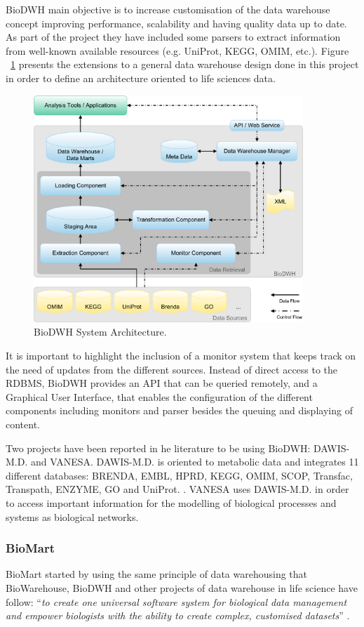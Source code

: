 BioDWH main objective is to increase customisation of the data warehouse concept improving performance, scalability and having quality data up to date. As part of the project they have included some parsers to extract information from well-known available resources (e.g. UniProt, KEGG, OMIM, etc.). Figure ~\ref{fig:biodwh} presents the extensions to a general data warehouse design done in this project in order to define an architecture oriented to life sciences data.

\begin{figure}  
\centering
\includegraphics[width=4in]{figures/dwh_architecture.png}
\caption[BioDWH System Architecture.]{BioDWH System Architecture.
\label{fig:biodwh}}
\end{figure}

It is important to highlight the inclusion of a monitor system that keeps track on the need of updates from the different sources. Instead of direct access to the RDBMS, BioDWH provides an API that can be queried remotely, and a Graphical User Interface, that enables the configuration of the different components including monitors and parser besides the queuing and displaying of content.

Two projects have been reported in he literature to be using BioDWH: DAWIS-M.D. and VANESA. DAWIS-M.D. is oriented to metabolic data and integrates 11 different databases: BRENDA, EMBL, HPRD, KEGG, OMIM, SCOP, Transfac, Transpath, ENZYME, GO and UniProt. \cite{HIP2010}. VANESA uses DAWIS-M.D. in order to access important information for the modelling of biological processes and systems as biological networks\cite{BRI2014}.

\subsubsection{BioMart}
BioMart started by using the same principle of data warehousing that BioWarehouse, BioDWH and other projects of data warehouse in life science have follow: ``\emph{to create one universal software system for biological data management and empower biologists with the ability to create complex, customised datasets}'' \cite{KAS2011}.

